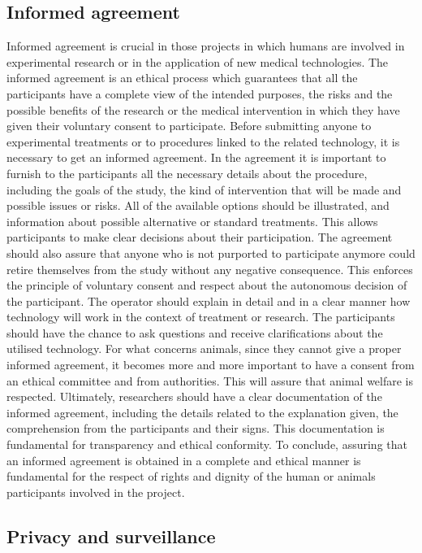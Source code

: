 \documentclass{Configuration_Files/PoliMi3i_thesis}
\begin{document}
\subsection{Informed agreement }

Informed agreement is crucial in those projects in which humans are involved in experimental research or in the application of new medical technologies. The informed agreement is an ethical process which guarantees that all the participants have a complete view of the intended purposes, the risks and the possible benefits of the research or the medical intervention in which they have given their voluntary consent to participate. Before submitting anyone to experimental treatments or to procedures linked to the related technology, it is necessary to get an informed agreement.
In the agreement it is important to furnish to the participants all the necessary details about the procedure, including the goals of the study, the kind of intervention that will be made and possible issues or risks. All of the available options should be illustrated, and information about possible alternative or standard treatments. This allows participants to make clear decisions about their participation. 
The agreement should also assure that anyone who is not purported to participate anymore could retire themselves from the study without any negative consequence. This enforces the principle of voluntary consent and respect about the autonomous decision of the participant.
The operator should explain in detail and in a clear manner how technology will work in the context of treatment or research. The participants should have the chance to ask questions and receive clarifications about the utilised technology.
For what concerns animals, since they cannot give a proper informed agreement, it becomes more and more important to have a consent from an ethical committee and from authorities. This will assure that animal welfare is respected.
Ultimately, researchers should have a clear documentation of the informed agreement, including the details related to the explanation given, the comprehension from the participants and their signs. This documentation is fundamental for transparency and ethical conformity.
To conclude, assuring that an informed agreement is obtained in a complete and ethical manner is fundamental for the respect of rights and dignity of the human or animals participants involved in the project.

\subsection{Privacy and surveillance}
\end{document}
